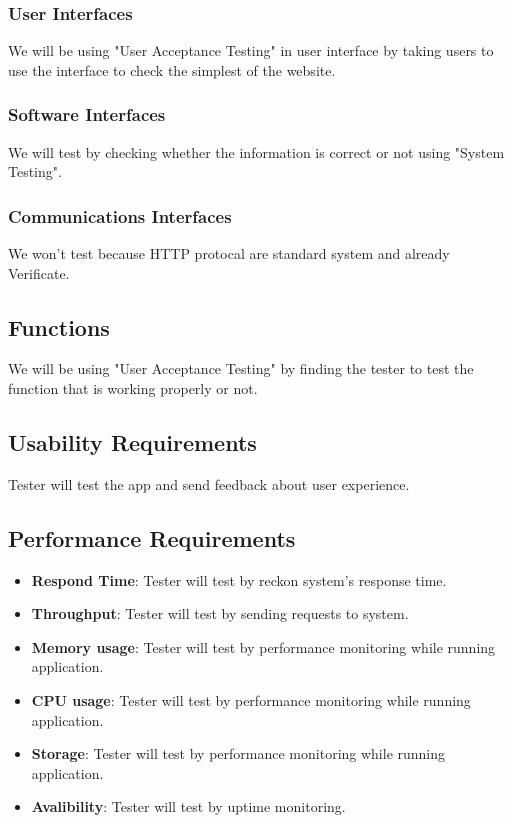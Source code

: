 \documentclass[ 10pt]{report}
\begin{document}
        \subsubsection{User Interfaces}
            We will be using "User Acceptance Testing" in user interface by taking users to use the interface to check the simplest of the website.
        \subsubsection{Software Interfaces}
            We will test by checking whether the information is correct or not using "System Testing".
        \subsubsection{Communications Interfaces}
            We won't test because HTTP protocal are standard system and already Verificate.
        \subsection{Functions}
        We will be using "User Acceptance Testing" by finding the tester to test the function that is working properly or not.
        \subsection{Usability Requirements}
        Tester will test the app and send feedback about user experience.
        \subsection{Performance Requirements}
        \begin{itemize}
            \item \textbf{Respond Time}: Tester will test by reckon system's response time.  
            \item \textbf{Throughput}: Tester will test by sending requests to system.
            \item \textbf{Memory usage}: Tester will test by performance monitoring while running application.
            \item \textbf{CPU usage}: Tester will test by performance monitoring while running application.
            \item \textbf{Storage}: Tester will test by performance monitoring while running application.
            \item \textbf{Avalibility}: Tester will test by uptime monitoring.
            \end{itemize}
\end{document}
